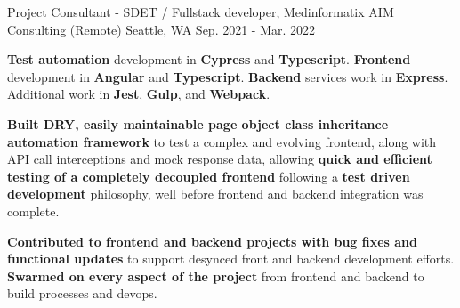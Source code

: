\begin{cventries}
\cventry
{Project Consultant - SDET / Fullstack developer, Medinformatix} %
{AIM Consulting (Remote)} %
{Seattle, WA} %
{Sep. 2021 - Mar. 2022} %
{
\begin{cvitems}
\item {\textbf{Test automation} development in \textbf{Cypress} and \textbf{Typescript}. \textbf{Frontend} development in \textbf{Angular} and \textbf{Typescript}. \textbf{Backend} services work in \textbf{Express}. Additional work in \textbf{Jest}, \textbf{Gulp}, and \textbf{Webpack}.}
\item {\textbf{Built DRY, easily maintainable page object class inheritance automation framework} to test a complex and evolving frontend, along with API call interceptions and mock response data, allowing \textbf{quick and efficient testing of a completely decoupled frontend} following a \textbf{test driven development} philosophy, well before frontend and backend integration was complete.}
\item {\textbf{Contributed to frontend and backend projects with bug fixes and functional updates} to support desynced front and backend development efforts. \textbf{Swarmed on every aspect of the project} from frontend and backend to build processes and devops.}
\end{cvitems}
}


\end{cventries}
